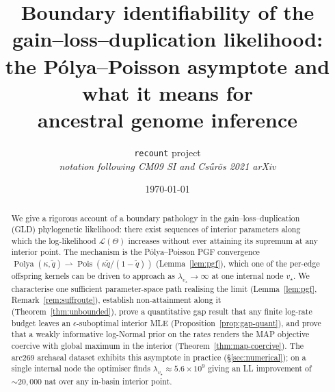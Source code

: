\documentclass[11pt]{article}
\title{Boundary identifiability of the gain--loss--duplication likelihood:\\
       the Pólya--Poisson asymptote and what it means for\\
       ancestral genome inference}
\author{\texttt{recount} project\\
        \textit{notation following CM09 SI and Cs\H{u}r\"os 2021 arXiv}}
\date{\today}
\newcommand{\rate}{\kappa}             %
\newcommand{\dup}{\lambda}             %
\newcommand{\survq}{\tilde q}          %
\newcommand{\Ll}{\mathcal{L}}
\DeclareMathOperator{\Pol}{Polya}
\DeclareMathOperator{\Poi}{Pois}
\theoremstyle{definition}
\begin{document}
\maketitle

\begin{center}
\end{center}

\begin{abstract}
We give a rigorous account of a boundary pathology in the
gain--loss--duplication (GLD) phylogenetic likelihood: there exist
sequences of interior parameters along which the log-likelihood
$\Ll(\Theta)$ increases without ever attaining its supremum at any
interior point. The mechanism is the Pólya--Poisson PGF convergence
$\Pol(\rate,\survq) \rightharpoonup \Poi(\rate\survq/(1-\survq))$
(Lemma~\ref{lem:pgf}), which one of the per-edge offspring kernels
can be driven to approach as $\dup_{v_\star}\to\infty$ at one
internal node $v_\star$. We characterise one sufficient
parameter-space path realising the limit
(Lemma~\ref{lem:pgf}, Remark~\ref{rem:suffroute}), establish
non-attainment along it (Theorem~\ref{thm:unbounded}), prove a
quantitative gap result that any finite log-rate budget leaves an
$\epsilon$-suboptimal interior MLE
(Proposition~\ref{prop:gap-quant}), and prove that a weakly
informative log-Normal prior on the rates renders the MAP objective
coercive with global maximum in the interior
(Theorem~\ref{thm:map-coercive}). The arc269 archaeal dataset
exhibits this asymptote in practice
(\S\ref{sec:numerical}); on a single internal node the optimiser
finds $\dup_{v_\star} \approx 5.6\times10^9$ giving an LL
improvement of $\sim 20{,}000$ nat over any in-basin interior point.
\end{abstract}
\end{document}
